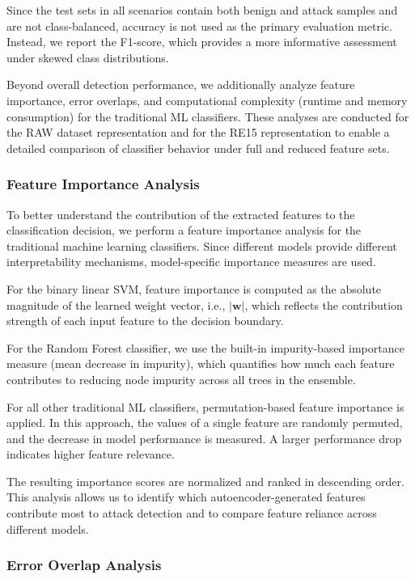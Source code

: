 Since the test sets in all scenarios contain both benign and
attack samples and are not class-balanced, accuracy is not used
as the primary evaluation metric.
Instead, we report the F1-score,
which provides a more informative assessment under skewed
class distributions.

Beyond overall detection performance, we additionally analyze
feature importance, error overlaps, and computational complexity
(runtime and memory consumption) for the traditional ML classifiers.
These analyses are conducted for the RAW dataset representation
and for the RE15 representation to enable a detailed comparison
of classifier behavior under full and reduced feature sets.
\subsubsection{Feature Importance Analysis}
\label{subsubsec:feature_importance}

To better understand the contribution of the extracted features to the classification
decision, we perform a feature importance analysis for the traditional machine learning
classifiers. Since different models provide different interpretability mechanisms,
model-specific importance measures are used.

For the binary linear \ac{SVM}, feature importance is computed
as the absolute magnitude of the learned weight vector, i.e., $|\mathbf{w}|$,
which reflects the contribution strength of each input feature to the decision boundary.

For the Random Forest classifier, we use the built-in impurity-based importance
measure (mean decrease in impurity), which quantifies how much each feature
contributes to reducing node impurity across all trees in the ensemble.

For all other traditional \ac{ML} classifiers, permutation-based feature importance
is applied. In this approach, the values of a single feature are randomly permuted,
and the decrease in model performance is measured. A larger performance drop
indicates higher feature relevance.

The resulting importance scores are normalized and ranked in descending order.
This analysis allows us to identify which autoencoder-generated features contribute
most to attack detection and to compare feature reliance across different models.

\subsubsection{Error Overlap Analysis}

